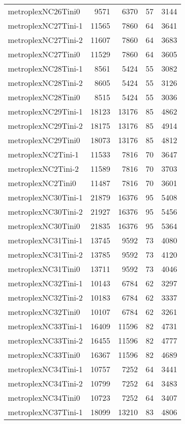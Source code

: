 \begin{longtable}{lrrrr}
metroplexNC26Tini0 & 9571 & 6370 & 57 & 3144 \\
metroplexNC27Tini-1 & 11565 & 7860 & 64 & 3641 \\
metroplexNC27Tini-2 & 11607 & 7860 & 64 & 3683 \\
metroplexNC27Tini0 & 11529 & 7860 & 64 & 3605 \\
metroplexNC28Tini-1 & 8561 & 5424 & 55 & 3082 \\
metroplexNC28Tini-2 & 8605 & 5424 & 55 & 3126 \\
metroplexNC28Tini0 & 8515 & 5424 & 55 & 3036 \\
metroplexNC29Tini-1 & 18123 & 13176 & 85 & 4862 \\
metroplexNC29Tini-2 & 18175 & 13176 & 85 & 4914 \\
metroplexNC29Tini0 & 18073 & 13176 & 85 & 4812 \\
metroplexNC2Tini-1 & 11533 & 7816 & 70 & 3647 \\
metroplexNC2Tini-2 & 11589 & 7816 & 70 & 3703 \\
metroplexNC2Tini0 & 11487 & 7816 & 70 & 3601 \\
metroplexNC30Tini-1 & 21879 & 16376 & 95 & 5408 \\
metroplexNC30Tini-2 & 21927 & 16376 & 95 & 5456 \\
metroplexNC30Tini0 & 21835 & 16376 & 95 & 5364 \\
metroplexNC31Tini-1 & 13745 & 9592 & 73 & 4080 \\
metroplexNC31Tini-2 & 13785 & 9592 & 73 & 4120 \\
metroplexNC31Tini0 & 13711 & 9592 & 73 & 4046 \\
metroplexNC32Tini-1 & 10143 & 6784 & 62 & 3297 \\
metroplexNC32Tini-2 & 10183 & 6784 & 62 & 3337 \\
metroplexNC32Tini0 & 10107 & 6784 & 62 & 3261 \\
metroplexNC33Tini-1 & 16409 & 11596 & 82 & 4731 \\
metroplexNC33Tini-2 & 16455 & 11596 & 82 & 4777 \\
metroplexNC33Tini0 & 16367 & 11596 & 82 & 4689 \\
metroplexNC34Tini-1 & 10757 & 7252 & 64 & 3441 \\
metroplexNC34Tini-2 & 10799 & 7252 & 64 & 3483 \\
metroplexNC34Tini0 & 10723 & 7252 & 64 & 3407 \\
metroplexNC37Tini-1 & 18099 & 13210 & 83 & 4806 \\

\end{longtable}
